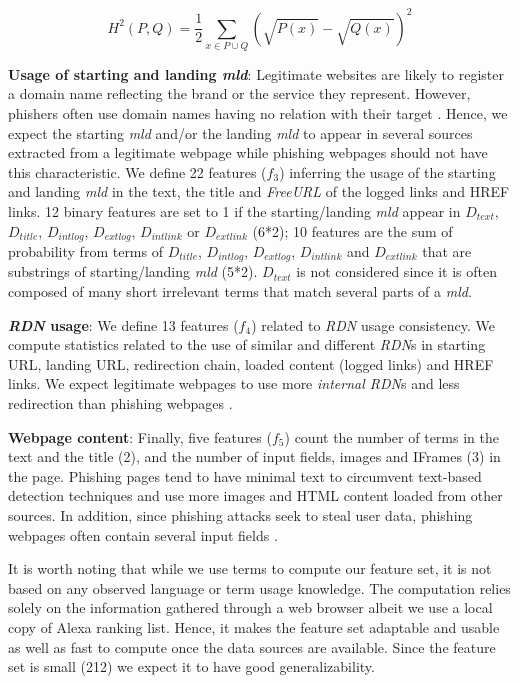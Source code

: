 \documentclass[10pt,conference,compsocconf,letterpaper]{IEEEtran}
\begin{document}
\begin{equation}
H^{2}(P,Q) = \frac{1}{2} \sum_{x\in P\cup Q}\left(\sqrt{P(x)} - \sqrt{Q(x)}\right) ^{2}
\label{eq:hellinger}
\end{equation}
\fi

\noindent\textbf{Usage of starting and landing \textit{mld}}: Legitimate websites are likely to register a domain name reflecting the brand or the service they represent. However, phishers often use domain names having no relation with their target \cite{Xiang:2009:hybrid}. Hence, we expect the starting \textit{mld} and/or the landing \textit{mld} to appear in several sources extracted from a legitimate webpage while phishing webpages should not have this characteristic.  
We define 22 features ($f_3$) inferring the usage of the starting and landing \textit{mld} in the text, the title and \textit{FreeURL} of the logged links and HREF links. 
12 binary features are  set to 1 if the starting/landing \textit{mld} appear in $D_{text}$, $D_{title}$, $D_{intlog}$, $D_{extlog}$, $ D_{intlink}$ or $D_{extlink}$ (6*2); 10  features are the sum of probability from terms of $D_{title}$, $D_{intlog}$, $D_{extlog}$, $ D_{intlink}$ and $D_{extlink}$  that are substrings of starting/landing \textit{mld} (5*2). $D_{text}$ is not considered since it is often composed of many short irrelevant terms that match several parts of a \textit{mld}.

\noindent\textbf{\textit{RDN} usage}: We define 13 features ($f_4$) related to \textit{RDN} usage consistency. We compute statistics related to the use of similar and different \textit{RDN}s in starting URL, landing URL, redirection chain, loaded content (logged links) and HREF links. We expect legitimate webpages to use more \textit{internal RDN}s and less redirection than phishing webpages \cite{li:2014:hunting}. 

\noindent\textbf{Webpage content}: Finally, five features ($f_5$) count the number of terms in the text and the title (2), and the number of input fields, images and IFrames (3) in the page. Phishing pages tend to have minimal text to circumvent text-based detection techniques \cite{ramanathan:2013:phishing} and use more images and HTML content loaded from other sources. In addition, since phishing attacks seek to steal user data, phishing webpages often contain several input fields \cite{Xiang:2009:hybrid}.

It is worth noting that while we use terms to compute our feature set, it is not based on any observed language or term usage knowledge. The computation relies solely on the information gathered through a web browser albeit we use a local copy of Alexa ranking list. Hence, it makes the feature set adaptable and usable as well as fast to compute once the data sources are available. 
Since the feature set is small (212) we expect it to have good generalizability.
\end{document}
